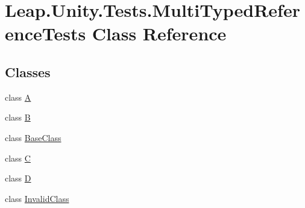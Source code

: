 \hypertarget{class_leap_1_1_unity_1_1_tests_1_1_multi_typed_reference_tests}{}\section{Leap.\+Unity.\+Tests.\+Multi\+Typed\+Reference\+Tests Class Reference}
\label{class_leap_1_1_unity_1_1_tests_1_1_multi_typed_reference_tests}
\subsection*{Classes}
\begin{DoxyCompactItemize}
\item 
class \mbox{\hyperlink{class_leap_1_1_unity_1_1_tests_1_1_multi_typed_reference_tests_1_1_a}{A}}
\item 
class \mbox{\hyperlink{class_leap_1_1_unity_1_1_tests_1_1_multi_typed_reference_tests_1_1_b}{B}}
\item 
class \mbox{\hyperlink{class_leap_1_1_unity_1_1_tests_1_1_multi_typed_reference_tests_1_1_base_class}{Base\+Class}}
\item 
class \mbox{\hyperlink{class_leap_1_1_unity_1_1_tests_1_1_multi_typed_reference_tests_1_1_c}{C}}
\item 
class \mbox{\hyperlink{class_leap_1_1_unity_1_1_tests_1_1_multi_typed_reference_tests_1_1_d}{D}}
\item 
class \mbox{\hyperlink{class_leap_1_1_unity_1_1_tests_1_1_multi_typed_reference_tests_1_1_invalid_class}{Invalid\+Class}}
\end{DoxyCompactItemize}
